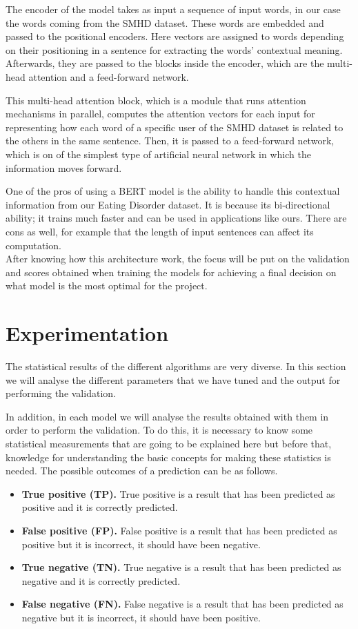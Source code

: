 The encoder of the model takes as input a sequence of input words, in our case the words coming from the SMHD dataset. These words are embedded and passed to the positional encoders. Here vectors are assigned to words depending on their positioning in a sentence for extracting the words' contextual meaning. Afterwards, they are passed to the blocks inside the encoder, which are the multi-head attention and a feed-forward network.  

This multi-head attention block, which is a module that runs attention mechanisms in parallel, computes the attention vectors for each input for representing how each word of a specific user of the SMHD dataset is related to the others in the same sentence. Then, it is passed to a feed-forward network, which is on of the simplest type of artificial neural network in which the information moves forward.

One of the pros of using a BERT model is the ability to handle this contextual information from our Eating Disorder dataset. It is because its bi-directional ability; it trains much faster and can be used in applications like ours. There are cons as well, for example that the length of input sentences can affect its computation. \\

After knowing how this architecture work, the focus will be put on the validation and scores obtained when training the models for achieving a final decision on what model is the most optimal for the project.

\section{Experimentation}
The statistical results of the different algorithms are very diverse. In this section we will analyse the different parameters that we have tuned and the output for performing the validation.

In addition, in each model we will analyse the results obtained with them in order to perform the validation. To do this, it is necessary to know some statistical measurements that are going to be explained here but before that, knowledge for understanding the basic concepts for making these statistics is needed. The possible outcomes of a prediction can be as follows.
\begin{itemize}
    \item\textbf{ True positive (TP).} True positive is a result that has been predicted as positive and it is correctly predicted.
    \item\textbf{ False positive (FP).} False positive is a result that has been predicted as positive but it is incorrect, it should have been negative. 
    \item \textbf{True negative (TN).} True negative is a result that has been predicted as negative and it is correctly predicted. 
    \item \textbf{False negative (FN).} False negative is a result that has been predicted as negative but it is incorrect, it should have been positive.
\end{itemize}

